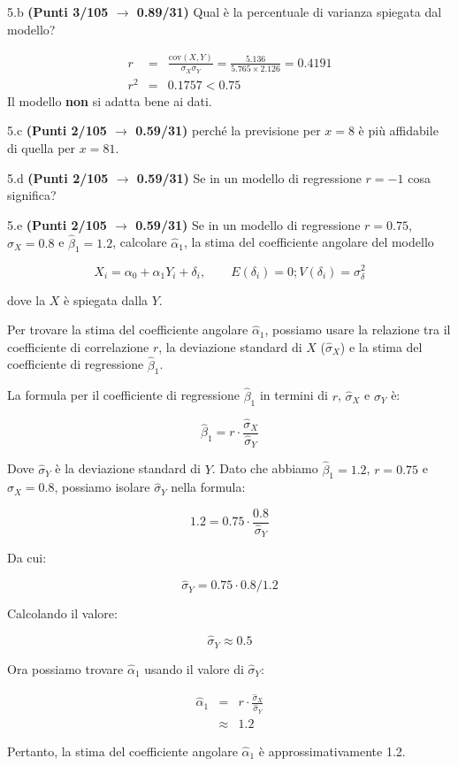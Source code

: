 \documentclass[
  11pt,
]{book}
\theoremstyle{mytheoremstyle}
\theoremstyle{mydefstyle}
\newenvironment{sol}
  {
  \begin{tcolorbox}[enhanced,breakable,arc=0.1mm,boxrule=1pt,colback=white,colframe=iblue,
  title=\bf \fontfamily{lmss}\selectfont \hspace{.5 cm} Soluzione,drop fuzzy shadow]

}{
\end{tcolorbox}
  }
\begin{document}
5.b \textbf{(Punti 3/105 \(\rightarrow\) 0.89/31)} Qual è la percentuale di varianza spiegata dal modello?

\begin{sol}
\begin{eqnarray*}
r&=&\frac{\text{cov}(X,Y)}{\sigma_X\sigma_Y}=\frac{ 5.136 }{ 5.765 \times 2.126 }= 0.4191 \\r^2&=& 0.1757 < 0.75
\end{eqnarray*}
Il modello \textbf{non} si adatta bene ai dati.

\end{sol}

5.c \textbf{(Punti 2/105 \(\rightarrow\) 0.59/31)} perché la previsione per \(x=8\) è più affidabile di quella per \(x=81\).

5.d \textbf{(Punti 2/105 \(\rightarrow\) 0.59/31)} Se in un modello di regressione \(r=-1\) cosa significa?

5.e \textbf{(Punti 2/105 \(\rightarrow\) 0.59/31)} Se in un modello di regressione \(r=0.75\), \(\hat\sigma_X=0.8\) e \(\hat\beta_1=1.2\), calcolare
\(\hat\alpha_1\), la stima del coefficiente angolare del modello

\[
X_i = \alpha_0+\alpha_1 Y_i + \delta_i, \qquad E(\delta_i)=0; V(\delta_i)=\sigma_\delta^2
\]

dove la \(X\) è spiegata dalla \(Y\).

\begin{sol}
Per trovare la stima del coefficiente angolare \(\hat\alpha_1\), possiamo usare la relazione tra il coefficiente di correlazione \(r\), la deviazione standard di \(X\) (\(\hat\sigma_X\)) e la stima del coefficiente di regressione \(\hat\beta_1\).

La formula per il coefficiente di regressione \(\hat\beta_1\) in termini di \(r\), \(\hat\sigma_X\) e \(\hat\sigma_Y\) è:

\[
\hat\beta_1 = r \cdot \frac{\hat\sigma_X}{\hat\sigma_Y}
\]

Dove \(\hat\sigma_Y\) è la deviazione standard di \(Y\). Dato che abbiamo \(\hat\beta_1 = 1.2\), \(r = 0.75\) e \(\hat\sigma_X = 0.8\), possiamo isolare \(\hat\sigma_Y\) nella formula:

\[
1.2 = 0.75 \cdot \frac{0.8}{\hat\sigma_Y}
\]

Da cui:

\[
\hat\sigma_Y = 0.75 \cdot 0.8 / 1.2
\]

Calcolando il valore:

\[
\hat\sigma_Y \approx 0.5
\]

Ora possiamo trovare \(\hat\alpha_1\) usando il valore di \(\hat\sigma_Y\):

\begin{eqnarray*}
   \hat\alpha_1 &=& r \cdot \frac{\hat\sigma_X}{\hat\sigma_Y}\\
               &\approx& 1.2
\end{eqnarray*}

Pertanto, la stima del coefficiente angolare \(\hat\alpha_1\) è approssimativamente 1.2.

\end{sol}
\end{document}
